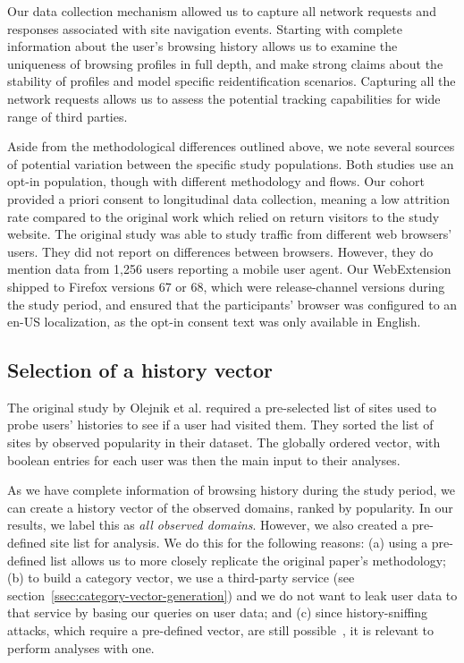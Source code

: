 \documentclass[letterpaper,twocolumn,10pt]{article}
\begin{document}
Our data collection mechanism allowed us to capture all network requests and responses associated with site navigation events. 
Starting with complete information about the user's browsing history allows us to examine the uniqueness of browsing profiles in full depth, and make strong claims about the stability of profiles and model specific reidentification scenarios. 
Capturing all the network requests allows us to assess the potential tracking capabilities for wide range of third parties. 

Aside from the methodological differences outlined above, we note several sources of potential variation between the specific study populations. Both studies use an opt-in population, though with different methodology and flows. Our cohort provided a priori consent to longitudinal data collection, meaning a low attrition rate compared to the original work which relied on return visitors to the study website.
The original study was able to study traffic from different web browsers' users. 
They did not report on differences between browsers. However, they do mention data from 1,256 users reporting a mobile user agent.
Our WebExtension shipped to Firefox versions 67 or 68, which were release-channel versions during the study period, and ensured that the participants' browser was configured to an en-US localization, as the opt-in consent text was only available in English.
%
\subsection{Selection of a history vector}
\label{ssec:selection-of-history-vector}
The original study by Olejnik et al. required a pre-selected list of sites used to probe users' histories to see if a user had visited them. 
They sorted the list of sites by observed popularity in their dataset.
The globally ordered vector, with boolean entries for each user was then the main input to their analyses. 

As we have complete information of browsing history during the study period, we can create a history vector of the observed domains, ranked by popularity.
In our results, we label this as \textit{all observed domains}.
However, we also created a pre-defined site list for analysis.
We do this for the following reasons: (a) using a pre-defined list allows us to more closely replicate the original paper's methodology; (b) to build a category vector, we use a third-party service (see section~\ref{ssec:category-vector-generation}) and we do not want to leak user data to that service by basing our queries on user data; and (c) since history-sniffing attacks, which require a pre-defined vector, are still possible~\cite{smithBrowserHistoryRe2018}, it is relevant to perform analyses with one.
\end{document}
